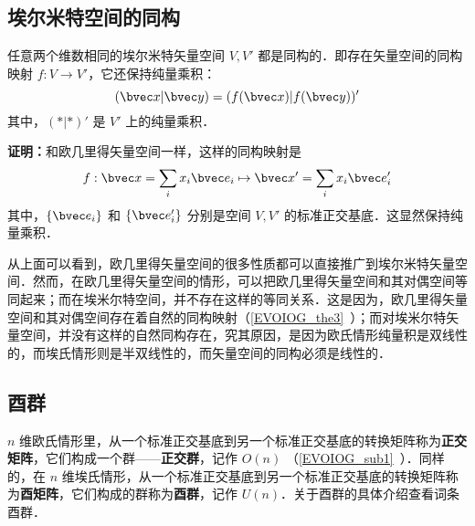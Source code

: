 \subsection{埃尔米特空间的同构}
\begin{theorem}{}
任意两个维数相同的埃尔米特矢量空间 $V,V'$ 都是同构的．即存在矢量空间的同构映射 $f:V\rightarrow V'$，它还保持纯量乘积：
\begin{equation}
(\bvec x|\bvec y)=(f(\bvec x)|f(\bvec y))'
\end{equation}
其中，$(*|*)'$ 是 $V'$ 上的纯量乘积．
\end{theorem}
\textbf{证明：}和欧几里得矢量空间一样，这样的同构映射是
\begin{equation}
f:\bvec x=\sum_{i}x_i\bvec e_i\mapsto\bvec x'=\sum_i x_i\bvec e'_i
\end{equation}
其中，$\{\bvec e_i\}$ 和 $\{\bvec e'_i\}$ 分别是空间 $V,V'$ 的标准正交基底．这显然保持纯量乘积．

从上面可以看到，欧几里得矢量空间的很多性质都可以直接推广到埃尔米特矢量空间．然而，在欧几里得矢量空间的情形，可以把欧几里得矢量空间和其对偶空间等同起来；而在埃米尔特空间，并不存在这样的等同关系．这是因为，欧几里得矢量空间和其对偶空间存在着自然的同构映射（\autoref{EVOIOG_the3}~）；而对埃米尔特矢量空间，并没有这样的自然同构存在，究其原因，是因为欧氏情形纯量积是双线性的，而埃氏情形则是半双线性的，而矢量空间的同构必须是线性的．
\subsection{酉群}
 $n$ 维欧氏情形里，从一个标准正交基底到另一个标准正交基底的转换矩阵称为\textbf{正交矩阵}，它们构成一个群——\textbf{正交群}，记作 $O(n)$ （\autoref{EVOIOG_sub1}~）．同样的，在 $n$ 维埃氏情形，从一个标准正交基底到另一个标准正交基底的转换矩阵称为\textbf{酉矩阵}，它们构成的群称为\textbf{酉群}，记作 $U(n)$．关于酉群的具体介绍查看词条酉群．
